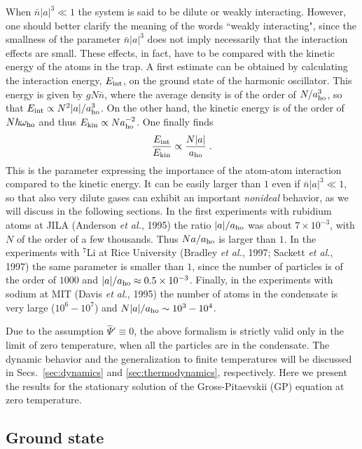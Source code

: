 When $\bar{n} |a|^3 \ll 1$ the system is said to be dilute or weakly
interacting.  However, one should better clarify the meaning of the 
words ``weakly interacting", since the smallness of  the parameter 
$\bar{n} |a|^3$ does not imply  necessarily that the interaction effects 
are small. These effects, in fact, have to be compared with the kinetic 
energy of the atoms in the trap.  A first estimate can be obtained by 
calculating the  interaction energy, $E_{\rm int}$, on the ground state 
of the harmonic oscillator. This energy is given by $g N \bar{n}$, where 
the average density is of the order of $N / a_{\rm ho}^3$, so that
$E_{\rm int} \propto N^2 |a| / a_{\rm ho}^3$.  On the other hand, the 
kinetic energy is of the order of $N \hbar \omega_{\rm ho}$ and thus 
$E_{\rm kin} \propto N a_{\rm ho}^{-2}$. One finally finds
\begin{equation}
{ E_{\rm int} \over E_{\rm kin} } \propto { N |a| \over a_{\rm ho} } \; .
\label{eq:naoveraho}
\end{equation}
This is the  parameter expressing the importance of the atom-atom
interaction compared to the kinetic energy. It can be easily larger
than $1$ even if $\bar{n} |a|^3 \ll 1$, so that also very dilute gases
can exhibit an important {\it nonideal} behavior, as we will 
discuss in the following sections. In 
the first experiments with rubidium atoms at JILA (Anderson {\it et al.}, 
1995) the ratio $|a| / a_{\rm ho}$ was about $7\times 10^{-3}$, with $N$ of
the order of a few thousands. Thus  $N a / a_{\rm ho}$ is larger
than $1$. In the experiments with $^7$Li at Rice University
(Bradley {\it et al.}, 1997; Sackett {\it et al.}, 1997) the same 
parameter is smaller
than $1$, since the number of particles is of the order of $1000$
and $|a|/a_{\rm ho} \approx 0.5 \times 10^{-3}$. Finally, in the
experiments with sodium at MIT (Davis {\it et al.}, 1995) the number
of atoms in the condensate is very large ($10^6 - 10^7$)
and $N |a| /a_{\rm ho} \sim 10^3 - 10^4$.

Due to the assumption $\hat\Psi' \equiv 0$, the above formalism
is strictly valid only in the limit of zero temperature, when all
the particles are in the condensate. The dynamic behavior and the
generalization to finite temperatures will be discussed in
Secs.~\ref{sec:dynamics} and \ref{sec:thermodynamics}, respectively.
Here we present the results for the stationary solution of the
Gross-Pitaevskii (GP) equation at zero temperature.

\subsection{Ground state}
\label{sec:stationaryGP}

